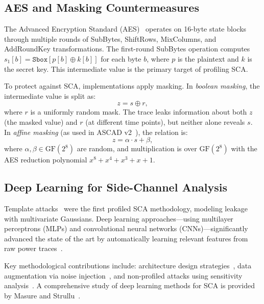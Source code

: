 \documentclass[submission]{iacrtrans}
\newcommand{\Sbox}{\mathtt{Sbox}}
\newcommand{\GF}{\mathrm{GF}}
\begin{document}
\subsection{AES and Masking Countermeasures}\label{sec:bg_aes}

The Advanced Encryption Standard (AES)~\cite{fips197} operates on 16-byte state blocks through multiple rounds of SubBytes, ShiftRows, MixColumns, and AddRoundKey transformations. The first-round SubBytes operation computes $s_1[b] = \Sbox[p[b] \oplus k[b]]$ for each byte $b$, where $p$ is the plaintext and $k$ is the secret key. This intermediate value is the primary target of profiling SCA.

To protect against SCA, implementations apply masking. In \emph{boolean masking}, the intermediate value is split as:
\begin{equation}
  z = s \oplus r,
\end{equation}
where $r$ is a uniformly random mask. The trace leaks information about both $z$ (the masked value) and $r$ (at different time points), but neither alone reveals $s$. In \emph{affine masking} (as used in ASCAD v2~\cite{cassiers2023prime}), the relation is:
\begin{equation}
  z = \alpha \cdot s + \beta,
\end{equation}
where $\alpha, \beta \in \GF(2^8)$ are random, and multiplication is over $\GF(2^8)$ with the AES reduction polynomial $x^8 + x^4 + x^3 + x + 1$.

\subsection{Deep Learning for Side-Channel Analysis}

Template attacks~\cite{chari2003template} were the first profiled SCA methodology, modeling leakage with multivariate Gaussians. Deep learning approaches---using multilayer perceptrons (MLPs) and convolutional neural networks (CNNs)---significantly advanced the state of the art by automatically learning relevant features from raw power traces~\cite{maghrebi2016breaking, benadjila2020deep}.

Key methodological contributions include: architecture design strategies~\cite{zaid2020methodology, wouters2020revisiting}, data augmentation via noise injection~\cite{kim2019make}, and non-profiled attacks using sensitivity analysis~\cite{timon2019non}. A comprehensive study of deep learning methods for SCA is provided by Masure and Strullu~\cite{masure2023comprehensive}.
\end{document}
